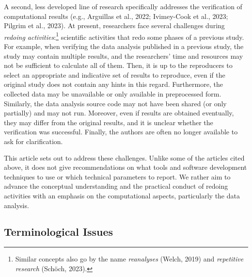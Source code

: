 \documentclass[authordate, meta]{jote-new-article}
\begin{document}
	A second, less developed line of research specifically addresses the verification of computational results (e.g., Arguillas et al., 2022; Ivimey-Cook et al., 2023; Pilgrim et al., 2023). At present, researchers face several challenges during \emph{redoing activities}:\footnote{ Similar concepts also go by the name \emph{reanalyses} (Welch, 2019) and \emph{repetitive research} (Schöch, 2023).} scientific activities that redo some phases of a previous study. For example, when verifying the data analysis published in a previous study, the study may contain multiple results, and the researchers' time and resources may not be sufficient to calculate all of them. Then, it is up to the reproducers to select an appropriate and indicative set of results to reproduce, even if the original study does not contain any hints in this regard. Furthermore, the collected data may be unavailable or only available in preprocessed form. Similarly, the data analysis source code may not have been shared (or only partially) and may not run. Moreover, even if results are obtained eventually, they may differ from the original results, and it is unclear whether the verification was successful. Finally, the authors are often no longer available to ask for clarification.



	This article sets out to address these challenges. Unlike some of the articles cited above, it does not give recommendations on what tools and software development techniques to use or which technical parameters to report. We rather aim to advance the conceptual understanding and the practical conduct of redoing activities with an emphasis on the computational aspects, particularly the data analysis.



	\subsection{Terminological Issues}
\end{document}
